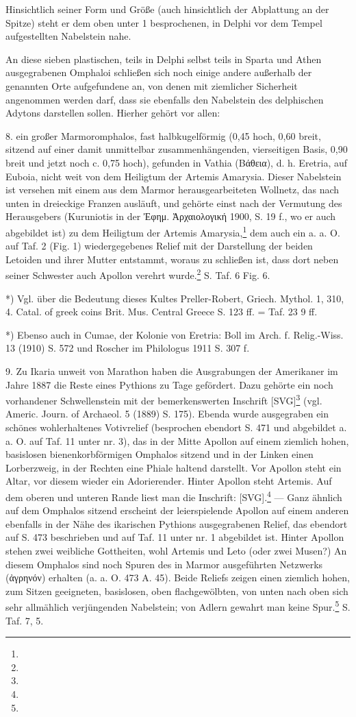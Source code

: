\documentclass[a4paper, 11pt, oneside]{article}
\begin{document}
Hinsichtlich seiner Form und Größe (auch hinsichtlich der Abplattung an der Spitze) steht er dem oben unter 1 besprochenen, in Delphi vor dem Tempel aufgestellten Nabelstein nahe.

An diese sieben plastischen, teils in Delphi selbst teils in Sparta und Athen ausgegrabenen Omphaloi schließen sich noch einige andere außerhalb der genannten Orte aufgefundene an, von denen mit ziemlicher Sicherheit angenommen werden darf, dass sie ebenfalls den Nabelstein des delphischen Adytons darstellen sollen. Hierher gehört vor allen:

8. ein großer Marmoromphalos, fast halbkugelförmig (0,45 hoch, 0,60 breit, sitzend auf einer damit unmittelbar zusammenhängenden, vierseitigen Basis, 0,90 breit und jetzt noch c. 0,75 hoch), gefunden in Vathia (Βάθεια), d. h. Eretria, auf Euboia, nicht weit von dem Heiligtum der Artemis Amarysia. Dieser Nabelstein ist versehen mit einem aus dem Marmor herausgearbeiteten Wollnetz, das nach unten in dreieckige Franzen ausläuft, und gehörte einst nach der Vermutung des Herausgebers (Kuruniotis in der Ἐφημ. Ἀρχαιολογική 1900, S. 19 f., wo er auch abgebildet ist) zu dem Heiligtum der Artemis Amarysia,\footnote{} dem auch ein a. a. O. auf Taf. 2 (Fig. 1) wiedergegebenes Relief mit der Darstellung der beiden Letoiden und ihrer Mutter entstammt, woraus zu schließen ist, dass dort neben seiner Schwester auch Apollon verehrt wurde.\footnote{} S. Taf. 6 Fig. 6.

*) Vgl. über die Bedeutung dieses Kultes Preller-Robert, Griech. Mythol. 1, 310, 4. Catal. of greek coins Brit. Mus. Central Greece S. 123 ff. = Taf. 23 9 ff.

*) Ebenso auch in Cumae, der Kolonie von Eretria: Boll im Arch. f. Relig.-Wiss. 13 (1910) S. 572 und Roscher im Philologus 1911 S. 307 f.

9. Zu Ikaria unweit von Marathon haben die Ausgrabungen der Amerikaner im Jahre 1887 die Reste eines Pythions zu Tage gefördert. Dazu gehörte ein noch vorhandener Schwellenstein mit der bemerkenswerten Inschrift [SVG]\footnote{} (vgl. Americ. Journ. of Archaeol. 5 (1889) S. 175). Ebenda wurde ausgegraben ein schönes wohlerhaltenes Votivrelief (besprochen ebendort S. 471 und abgebildet a. a. O. auf Taf. 11 unter nr. 3), das in der Mitte Apollon auf einem ziemlich hohen, basislosen bienenkorbförmigen Omphalos sitzend und in der Linken einen Lorberzweig, in der Rechten eine Phiale haltend darstellt. Vor Apollon steht ein Altar, vor diesem wieder ein Adorierender. Hinter Apollon steht Artemis. Auf dem oberen und unteren Rande liest man die Inschrift: [SVG].\footnote{} --- Ganz ähnlich auf dem Omphalos sitzend erscheint der leierspielende Apollon auf einem anderen ebenfalls in der Nähe des ikarischen Pythions ausgegrabenen Relief, das ebendort auf S. 473 beschrieben und auf Taf. 11 unter nr. 1 abgebildet ist. Hinter Apollon stehen zwei weibliche Gottheiten, wohl Artemis und Leto (oder zwei Musen?) An diesem Omphalos sind noch Spuren des in Marmor ausgeführten Netzwerks (ἀγρηνόν) erhalten (a. a. O. 473 A. 45). Beide Reliefs zeigen einen ziemlich hohen, zum Sitzen geeigneten, basislosen, oben flachgewölbten, von unten nach oben sich sehr allmählich verjüngenden Nabelstein; von Adlern gewahrt man keine Spur.\footnote{} S. Taf. 7, 5.
\end{document}
